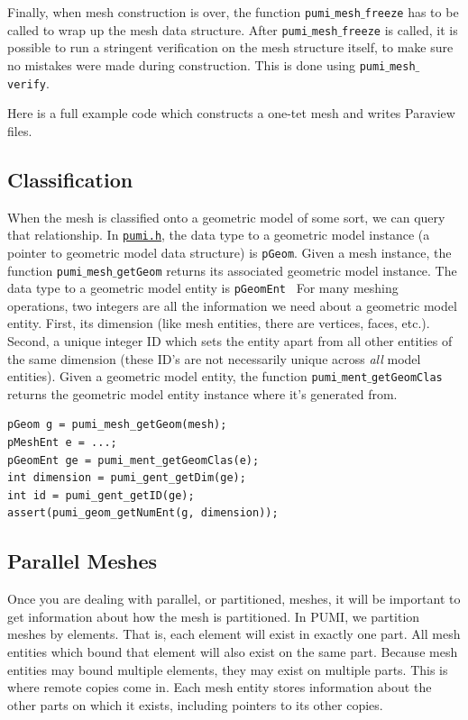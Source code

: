 \documentclass{article}
\begin{document}
{Finally, when mesh construction is over, the function \texttt{pumi$\_$mesh$\_$freeze} has to be called 
to wrap up the mesh data structure.
After \texttt{pumi$\_$mesh$\_$freeze} is called, it is possible to run
a stringent verification on the mesh structure itself,
to make sure no mistakes were made during construction.
This is done using \texttt{pumi$\_$mesh$\_$verify}.

Here is a full example code which constructs a one-tet
mesh and writes Paraview files.



\subsection{Classification}

When the mesh is classified onto a geometric model of some sort, we
can query that relationship. In \href{https://github.com/SCOREC/core/blob/master/pumi/pumi.h}{\texttt{pumi.h}}, the data type to a geometric model instance (a pointer to geometric model data structure) is \texttt{pGeom}. Given a mesh instance, the function \texttt{pumi$\_$mesh$\_$getGeom} returns its associated geometric model instance. The data type to a geometric model entity is {\texttt{pGeomEnt}}
\
For many meshing operations, two integers are all the information
we need about a geometric model entity.
First, its dimension (like mesh entities, there are vertices, faces, etc.).
Second, a unique integer ID which sets the entity apart from
all other entities of the same dimension (these ID's are not necessarily
unique across \emph{all} model entities).
Given a geometric model entity, the function \texttt{pumi$\_$ment$\_$getGeomClas} returns the geometric model entity instance where it's generated from.

\begin{lstlisting}
pGeom g = pumi_mesh_getGeom(mesh);
pMeshEnt e = ...;
pGeomEnt ge = pumi_ment_getGeomClas(e);
int dimension = pumi_gent_getDim(ge);
int id = pumi_gent_getID(ge);
assert(pumi_geom_getNumEnt(g, dimension));
\end{lstlisting}

\subsection{Parallel Meshes}

Once you are dealing with parallel, or partitioned, meshes,
it will be important to get information about how the
mesh is partitioned.
In PUMI, we partition meshes by elements.
That is, each element will exist in exactly one part.
All mesh entities which bound that element will also exist on
the same part.
Because mesh entities may bound multiple elements, they may
exist on multiple parts.
This is where remote copies come in.
Each mesh entity stores information about the other parts
on which it exists, including pointers to its other copies.

}
\end{document}
